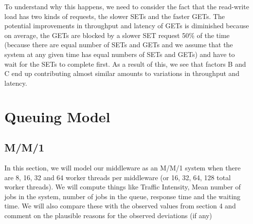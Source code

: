 \documentclass[11pt,a4paper]{article}
\newcommand\instructions[1]{\textcolor{blue}{Instructions: #1}}
\newcommand\todo[1]{\textcolor{red}{TODO: #1}}
\begin{document}
To understand why this happens, we need to consider the fact that the read-write load has two kinds of requests, the slower SETs and the faster GETs. The potential improvements in throughput and latency of GETs is diminished because on average, the GETs are blocked by a slower SET request 50\% of the time (because there are equal number of SETs and GETs and we assume that the system at any given time has equal numbers of SETs and GETs) and have to wait for the SETs to complete first. As a result of this, we see that factors B and C end up contributing almost similar amounts to variations in throughput and latency.

\section{Queuing Model}


\subsection{M/M/1}


In this section, we will model our middleware as an M/M/1 system when there are 8, 16, 32 and 64 worker threads per middleware (or 16, 32, 64, 128 total worker threads). We will compute things like Traffic Intensity, Mean number of jobs in the system, number of jobs in the queue, response time and the waiting time. We will also compare these with the observed values from section 4 and comment on the plausible reasons for the observed deviations (if any)
\end{document}
